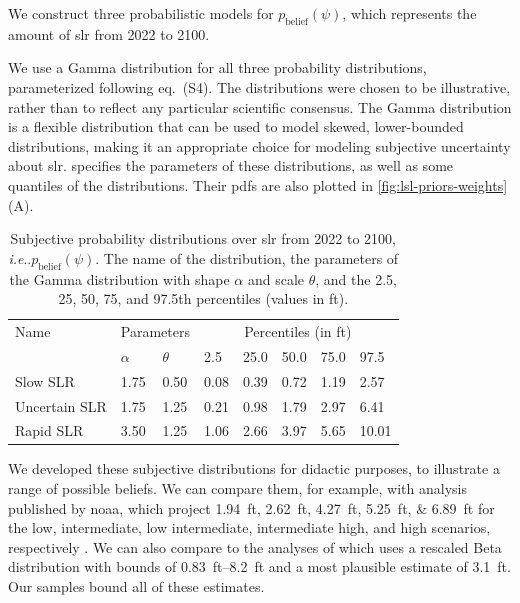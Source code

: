 \documentclass{agujournal2019}
\makeatletter
\DeclareRobustCommand\onedot{\futurelet\@let@token\@onedot}
\def\@onedot{\ifx\@let@token.\else.\null\fi\xspace}
\def\ie{\emph{i.e}\onedot} \def\Ie{\emph{I.e}\onedot}
\makeatother
\begin{document}
We construct three probabilistic models for $p_\mathrm{belief}(\psi)$, which represents the amount of \gls{slr} from 2022 to 2100.

We use a Gamma distribution for all three probability distributions, parameterized following eq.~(S4).
The distributions were chosen to be illustrative, rather than to reflect any particular scientific consensus.
The Gamma distribution is a flexible distribution that can be used to model skewed, lower-bounded distributions, making it an appropriate choice for modeling subjective uncertainty about \gls{slr}.
 specifies the parameters of these distributions, as well as some quantiles of the distributions.
Their \glspl{pdf} are also plotted in \cref{fig:lsl-priors-weights}(A).

\begin{table}[ht]
  \centering
  \caption{
    Subjective probability distributions over \gls{slr} from 2022 to 2100, \ie $p_\mathrm{belief}(\psi)$.
    The name of the distribution, the parameters of the Gamma distribution with shape $\alpha$ and scale $\theta$, and the 2.5, 25, 50, 75, and 97.5th percentiles (values in \si{ft}).
  }\label{tab:slr-priors}
  \begin{tabular}{llllllll}
    \toprule
    Name          & \multicolumn{2}{c}{Parameters} & \multicolumn{5}{c}{Percentiles (in \si{ft})}                                     \\
    \cmidrule(lr){2-3}
    \cmidrule(lr){4-8}
                  & $\alpha$                       & $\theta$                                     & 2.5  & 25.0 & 50.0 & 75.0 & 97.5  \\
    \midrule
    Slow SLR      & 1.75                           & 0.50                                         & 0.08 & 0.39 & 0.72 & 1.19 & 2.57  \\
    Uncertain SLR & 1.75                           & 1.25                                         & 0.21 & 0.98 & 1.79 & 2.97 & 6.41  \\
    Rapid SLR     & 3.50                           & 1.25                                         & 1.06 & 2.66 & 3.97 & 5.65 & 10.01 \\
    \bottomrule
  \end{tabular}
\end{table}


We developed these subjective distributions for didactic purposes, to illustrate a range of possible beliefs.
We can compare them, for example, with analysis published by \gls{noaa}, which project \SIlist{1.94;2.62;4.27;5.25;6.89}{ft} for the low, intermediate, low intermediate, intermediate high, and high scenarios, respectively \cite[table.~2.4]{sweet_slr:2022}.
We can also compare to the analyses of  which uses a rescaled Beta distribution with bounds of \SIrange{0.83}{8.2}{ft} and a most plausible estimate of \SI{3.1}{ft}.
Our samples bound all of these estimates.
\end{document}
